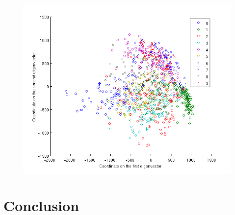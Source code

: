 \documentclass[10pt]{article}
\begin{document}
\begin{figure}
\centering
\includegraphics[width=0.5\columnwidth]{twod_digit.png}
\caption{}
\label{fig:twod}
\end{figure}


\section{Conclusion}
\end{document}
